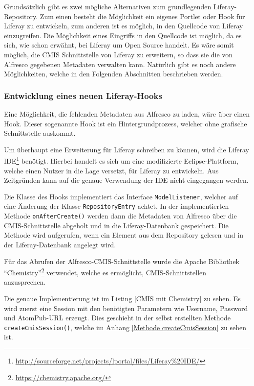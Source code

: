 Grunds\"atzlich gibt es zwei m\"ogliche Alternativen zum grundlegenden Liferay-Repository. Zum einen besteht die M\"oglichkeit ein eigenes Portlet oder Hook f\"ur Liferay zu entwickeln, zum anderen ist es m\"oglich, in den Quellcode von Liferay einzugreifen. Die M\"oglichkeit eines Eingriffs in den Quellcode ist m\"oglich, da es sich, wie schon erw\"ahnt, bei Liferay um Open Source handelt. Es w\"are somit m\"oglich, die \ac{CMIS} Schnittstelle von Liferay zu erweitern, so dass sie die von Alfresco gegebenen Metadaten verwalten kann. Nat\"urlich gibt es noch andere M\"oglichkeiten, welche in den Folgenden Abschnitten beschrieben werden.

\subsubsection{Entwicklung eines neuen Liferay-Hooks}\label{Liferay Hook}
Eine M\"oglichkeit, die fehlenden Metadaten aus Alfresco zu laden, w\"are \"uber einen Hook. Dieser sogenannte Hook ist ein Hintergrundprozess, welcher ohne grafische Schnittstelle auskommt. \cite{Liferay_in_Action}

Um \"uberhaupt eine Erweiterung f\"ur Liferay schreiben zu k\"onnen, wird die Liferay IDE\footnote{\url{http://sourceforge.net/projects/lportal/files/Liferay\%20IDE/}} ben\"otigt. Hierbei handelt es sich um eine modifizierte Eclipse-Plattform, welche einen Nutzer in die Lage versetzt, f\"ur Liferay zu entwickeln.
Aus Zeitgr\"unden kann auf die genaue Verwendung der IDE nicht eingegangen werden. 

Die Klasse des Hooks implementiert das Interface \texttt{ModelListener}, welcher auf eine \"Anderung der Klasse \texttt{RepositoryEntry} achtet.
In der implementierten Methode \texttt{onAfterCreate()} werden dann die Metadaten von Alfresco \"uber die \ac{CMIS}-Schnittstelle abgeholt und in die Liferay-Datenbank gespeichert. Die Methode wird aufgerufen, wenn ein Element aus dem Repository gelesen und in der Liferay-Datenbank angelegt wird.

F\"ur das Abrufen der Alfresco-\ac{CMIS}-Schnittstelle wurde die Apache Bibliothek "`Chemistry"'\footnote{\url{https://chemistry.apache.org/}} verwendet, welche es erm\"oglicht, \ac{CMIS}-Schnittstellen anzusprechen.

Die genaue Implementierung ist im Listing \ref{CMIS mit Chemistry} zu sehen. Es wird zuerst eine Session mit den ben\"otigten Parametern wie Username, Password und AtomPub-URL erzeugt. Dies geschieht in der selbst erstellten Methode \texttt{createCmisSession()}, welche im Anhang \ref{Methode createCmisSession} zu sehen ist.

